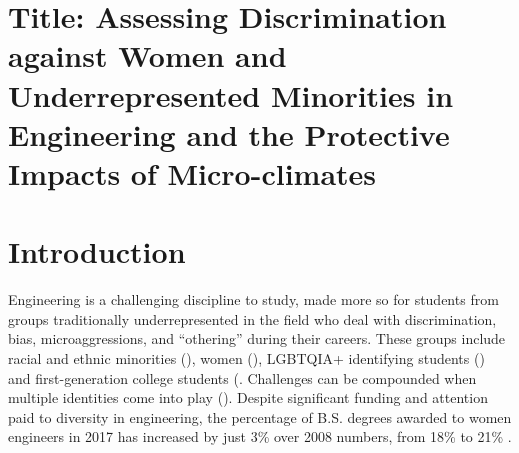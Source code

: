 \section{Title: Assessing Discrimination against Women and Underrepresented Minorities in Engineering and the Protective Impacts of Micro-climates}
\section{Introduction}
\label{sec:intro}

 
Engineering is a challenging discipline to study, made more so for students from groups traditionally underrepresented in the field who deal with discrimination, bias, microaggressions, and “othering” during their careers. These groups include racial and ethnic minorities (\eg \cite{Mcgee:2011}), women (\eg \cite{Moss-Racusin:2012}), LGBTQIA+ identifying students (\eg \cite{Cech:2011}) and first-generation college students (\eg \cite{Pascarella:2004,Carrigan, et al., 2019}. Challenges can be compounded when multiple identities come into play (\eg \citep{Williams:2014}). Despite significant funding and attention paid to diversity in engineering, the percentage of B.S. degrees awarded to women engineers in 2017 has increased by just 3\% over 2008 numbers, from 18\% to 21\% \citep{yoder2012engineering}. 
 
